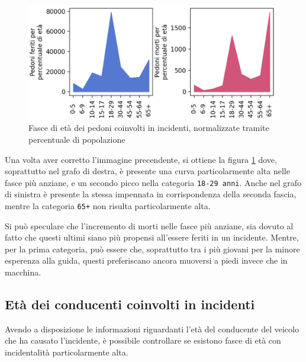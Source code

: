 \documentclass[a4paper,12pt]{report}
\newcommand{\columnstyle}[1]{\texttt{#1}}
\begin{document}
\begin{figure}
    \includegraphics[width=\linewidth]{../src/incidenti/incidenti_senza_coords/pedoni/eta_pedoni_norm.png}
    \caption{Fasce di età dei pedoni coinvolti in incidenti, normalizzate tramite percentuale di popolazione}
    \label{fig:eta-pedoni-norm}
\end{figure}

Una volta aver corretto l'immagine precendente, 
si ottiene la figura \ref{fig:eta-pedoni-norm} dove, soprattutto 
nel grafo di destra, è presente una curva particolarmente alta 
nelle fasce più anziane, e un secondo picco nella categoria \columnstyle{18-29 anni}.
Anche nel grafo di sinistra è presente la stessa impennata in corrispondenza 
della seconda fascia, mentre la categoria \columnstyle{65+} non 
risulta particolarmente alta.

Si può speculare che l'incremento di morti nelle fasce più anziane, sia dovuto al 
fatto che questi ultimi siano più propensi all'essere feriti in un incidente. 
Mentre, per la prima categoria, può essere che, soprattutto tra i più giovani
per la minore esperenza alla guida, 
questi preferiscano ancora muoversi a piedi invece che in macchina.

\subsection{Età dei conducenti coinvolti in incidenti}

Avendo a disposizione le informazioni riguardanti l'età del conducente del 
veicolo che ha causato l'incidente, è possibile controllare se esistono fasce di 
età con incidentalità particolarmente alta.
\end{document}
